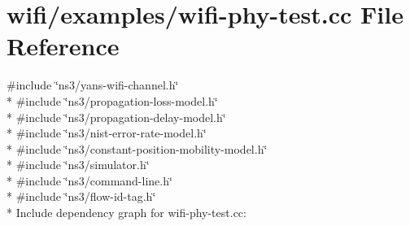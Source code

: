 \hypertarget{wifi-phy-test_8cc}{}\section{wifi/examples/wifi-\/phy-\/test.cc File Reference}
\label{wifi-phy-test_8cc}
{\ttfamily \#include \char`\"{}ns3/yans-\/wifi-\/channel.\+h\char`\"{}}\\*
{\ttfamily \#include \char`\"{}ns3/propagation-\/loss-\/model.\+h\char`\"{}}\\*
{\ttfamily \#include \char`\"{}ns3/propagation-\/delay-\/model.\+h\char`\"{}}\\*
{\ttfamily \#include \char`\"{}ns3/nist-\/error-\/rate-\/model.\+h\char`\"{}}\\*
{\ttfamily \#include \char`\"{}ns3/constant-\/position-\/mobility-\/model.\+h\char`\"{}}\\*
{\ttfamily \#include \char`\"{}ns3/simulator.\+h\char`\"{}}\\*
{\ttfamily \#include \char`\"{}ns3/command-\/line.\+h\char`\"{}}\\*
{\ttfamily \#include \char`\"{}ns3/flow-\/id-\/tag.\+h\char`\"{}}\\*
Include dependency graph for wifi-\/phy-\/test.cc\+:
